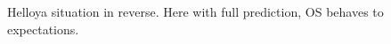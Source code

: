 \begin{figure}[ht]
\begin{subfigure}[b]{0.494\textwidth}
        \subcaption{}
    \end{subfigure}
    \hfill
    \caption{Helloya situation in reverse. Here with full prediction, \gls{OS} behaves to expectations.}

\end{figure}


